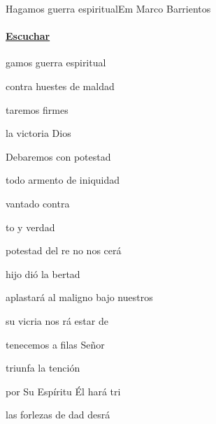 \documentclass[12pt, spanish]{book}
\begin{document}
    \begin{song}{Hagamos guerra espiritual}{Em}
        {} %
        {Marco Barrientos}
        {} %
        {}
        \ifChordBk
        \paragraph{\mbox{}\hfill\protect\href{https://open.spotify.com/intl-es/track/6ErNkHvdWep9w5HABFooQW}{Escuchar}\mbox{}\hfill}
        \fi

        \begin{SBOpGroup}
            gamos guerra espiritual

            contra  huestes de maldad

            taremos firmes

             la victoria  Dios
        \end{SBOpGroup}

        \begin{SBOpGroup}
            Debaremos con potestad

            todo armento de iniquidad

            vantado contra

            to y  verdad
        \end{SBOpGroup}

        \begin{SBOpGroup}
             potestad del re no nos cerá

             hijo  dió la bertad

            aplastará al maligno bajo nuestros 

             su vicria nos rá estar de 
        \end{SBOpGroup}

        \begin{SBOpGroup}
            tenecemos a  filas  Señor

             triunfa la tención

            por Su Espíritu Él  hará tri

            las forlezas de dad desrá
        \end{SBOpGroup}


\end{song}
\end{document}
